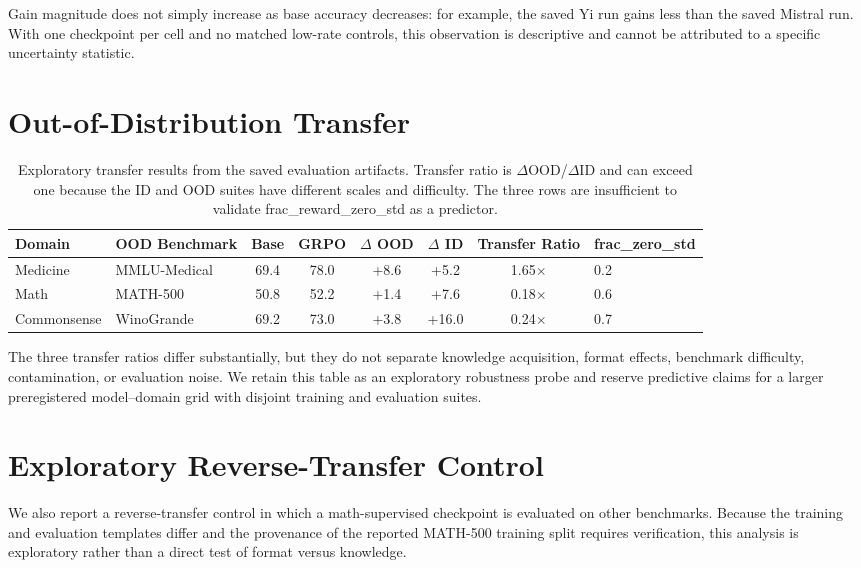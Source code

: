 \documentclass[11pt]{article}
\begin{document}
Gain magnitude does not simply increase as base accuracy decreases: for example, the saved Yi run gains less than the saved Mistral run. With one checkpoint per cell and no matched low-rate controls, this observation is descriptive and cannot be attributed to a specific uncertainty statistic.

\section{Out-of-Distribution Transfer}
\label{sec:ood_transfer}

\begin{table}[h]
\centering
\small
\begin{tabular}{@{}llcccccl@{}}
\toprule
\textbf{Domain} & \textbf{OOD Benchmark} & \textbf{Base} & \textbf{GRPO} & \textbf{$\Delta$ OOD} & \textbf{$\Delta$ ID} & \textbf{Transfer Ratio} & \textbf{frac\_zero\_std} \\
\midrule
Medicine & MMLU-Medical & 69.4 & 78.0 & +8.6 & +5.2 & 1.65$\times$ & 0.2 \\
Math & MATH-500 & 50.8 & 52.2 & +1.4 & +7.6 & 0.18$\times$ & 0.6 \\
Commonsense & WinoGrande & 69.2 & 73.0 & +3.8 & +16.0 & 0.24$\times$ & 0.7 \\
\bottomrule
\end{tabular}
\caption{Exploratory transfer results from the saved evaluation artifacts. Transfer ratio is $\Delta$OOD/$\Delta$ID and can exceed one because the ID and OOD suites have different scales and difficulty. The three rows are insufficient to validate frac\_reward\_zero\_std as a predictor.}
\label{tab:ood_transfer}
\end{table}

The three transfer ratios differ substantially, but they do not separate knowledge acquisition, format effects, benchmark difficulty, contamination, or evaluation noise. We retain this table as an exploratory robustness probe and reserve predictive claims for a larger preregistered model--domain grid with disjoint training and evaluation suites.

\section{Exploratory Reverse-Transfer Control}
\label{sec:sft_reverse_transfer}

We also report a reverse-transfer control in which a math-supervised checkpoint is evaluated on other benchmarks. Because the training and evaluation templates differ and the provenance of the reported MATH-500 training split requires verification, this analysis is exploratory rather than a direct test of format versus knowledge.
\end{document}
